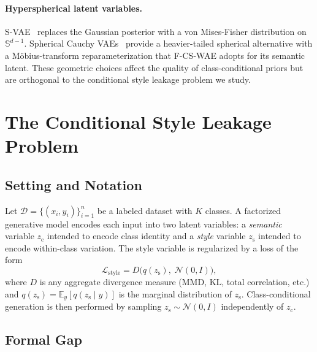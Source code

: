 \documentclass[10pt]{article}
\newcommand{\ours}{F-CS-WAE}
\newcommand{\zc}{z_{\mathrm{c}}}
\newcommand{\zs}{z_{\mathrm{s}}}
\newcommand{\Sph}{\mathbb{S}}
\begin{document}
\paragraph{Hyperspherical latent variables.}
S-VAE~\citep{davidson2018hyperspherical} replaces the Gaussian posterior with a
von Mises-Fisher distribution on $\Sph^{d-1}$.
Spherical Cauchy VAEs~\citep{sablica2025hyperspherical} provide a heavier-tailed
spherical alternative with a Möbius-transform reparameterization that \ours{}
adopts for its semantic latent.
These geometric choices affect the quality of class-conditional priors but are
orthogonal to the conditional style leakage problem we study.

\section{The Conditional Style Leakage Problem}
\label{sec:phenomenon}

\subsection{Setting and Notation}

Let $\mathcal{D}=\{(x_i,y_i)\}_{i=1}^n$ be a labeled dataset with $K$ classes.
A factorized generative model encodes each input into two latent variables:
a \emph{semantic} variable $\zc$ intended to encode class identity and a
\emph{style} variable $\zs$ intended to encode within-class variation.
The style variable is regularized by a loss of the form
\begin{equation}
  \mathcal{L}_{\mathrm{style}} = D\!\bigl(q(\zs),\;\mathcal{N}(0,I)\bigr),
  \label{eq:generic-style-reg}
\end{equation}
where $D$ is any aggregate divergence measure (MMD, KL, total correlation, etc.)
and $q(\zs) = \mathbb{E}_y[q(\zs\mid y)]$ is the marginal distribution of $\zs$.
Class-conditional generation is then performed by sampling $\zs\sim\mathcal{N}(0,I)$
independently of $\zc$.

\subsection{Formal Gap}
\label{sec:formal-gap}
\end{document}
